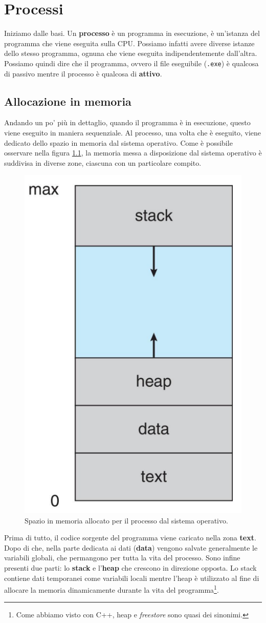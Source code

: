 \chapter{Processi}\label{processes}
Iniziamo dalle basi. Un \textbf{processo} è un programma in esecuzione, è un'istanza del programma che viene eseguita sulla CPU. Possiamo infatti avere diverse istanze dello stesso programma, ognuna che viene eseguita indipendentemente dall'altra. Possiamo quindi dire che il programma, ovvero il file eseguibile (\texttt{.exe}) è qualcosa di passivo mentre il processo è qualcosa di \textbf{attivo}.

% 
\section{Allocazione in memoria}
Andando un po' più in dettaglio, quando il programma è in esecuzione, questo viene eseguito in maniera sequenziale. Al processo, una volta che è eseguito, viene dedicato dello spazio in memoria dal sistema operativo. Come è possibile osservare nella figura \ref{fig:memory_layout}, la memoria messa a disposizione dal sistema operativo è suddivisa in diverse zone, ciascuna con un particolare compito.
\begin{figure}[h]
    \centering
    \includegraphics[width = .2\textwidth]{../res/imgs/processes/memory_layout.png}
    \caption{Spazio in memoria allocato per il processo dal sistema operativo.}
    \label{fig:memory_layout}
\end{figure}
Prima di tutto, il codice sorgente del programma viene caricato nella zona \textbf{text}. Dopo di che, nella parte dedicata ai dati (\textbf{data}) vengono salvate generalmente le variabili globali, che permangono per tutta la vita del processo. Sono infine presenti due parti: lo \textbf{stack} e l'\textbf{heap} che crescono in direzione opposta. Lo stack contiene dati temporanei come variabili locali mentre l'heap è utilizzato al fine di allocare la memoria dinamicamente durante la vita del programma\footnote{Come abbiamo visto con C++, heap e \textit{freestore} sono quasi dei sinonimi.}.

